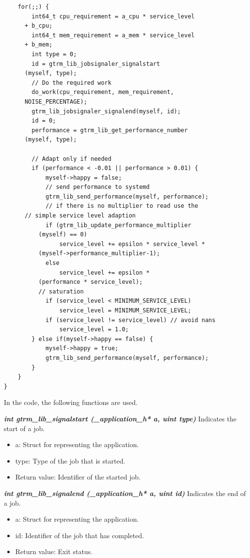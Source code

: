 \documentclass[nobiblatex]{LTHthesis}
\begin{document}
\begin{lstlisting}
	for(;;) {		
		int64_t cpu_requirement = a_cpu * service_level 
      + b_cpu;
		int64_t mem_requirement = a_mem * service_level 
      + b_mem;
		int type = 0;
		id = gtrm_lib_jobsignaler_signalstart
      (myself, type);		
		// Do the required work	
		do_work(cpu_requirement, mem_requirement, 
      NOISE_PERCENTAGE);	
		gtrm_lib_jobsignaler_signalend(myself, id);
		id = 0;										
		performance = gtrm_lib_get_performance_number
      (myself, type);
		
		// Adapt only if needed
		if (performance < -0.01 || performance > 0.01) {
			myself->happy = false;					
			// send performance to systemd
			gtrm_lib_send_performance(myself, performance);					
			// if there is no multiplier to read use the 
      // simple service level adaption
			if (gtrm_lib_update_performance_multiplier
          (myself) == 0)
				service_level += epsilon * service_level *
          (myself->performance_multiplier-1);
			else
				service_level += epsilon * 
          (performance * service_level);	
		  // saturation											
			if (service_level < MINIMUM_SERVICE_LEVEL)
				service_level = MINIMUM_SERVICE_LEVEL;
			if (service_level != service_level) // avoid nans
				service_level = 1.0;
		} else if(myself->happy == false) {			
			myself->happy = true;
			gtrm_lib_send_performance(myself, performance);
		}	
	}	
}
\end{lstlisting}

In the code, the following functions are used.
\begin{framed}
	\begin{flushleft}		
		\emph{\textbf{{int gtrm\_lib\_signalstart
      (\_application\_h* a, uint type)}}} \newline
				Indicates the start of a job.
				\begin{itemize}
				\item a: Struct for representing the application.
				\item type: Type of the job that is started.
				\item Return value: Identifier of the started job.
				\end{itemize}
	\end{flushleft}
\end{framed}

\begin{framed}
	\begin{flushleft}	
			\emph{\textbf{{int gtrm\_lib\_signalend
        (\_application\_h* a, uint id)}}} \newline
			Indicates the end of a job.
			\begin{itemize}
			\item a: Struct for representing the application.
			\item id: Identifier of the job that has completed.
			\item Return value: Exit status.
			\end{itemize}
	\end{flushleft}
\end{framed}
\end{document}

